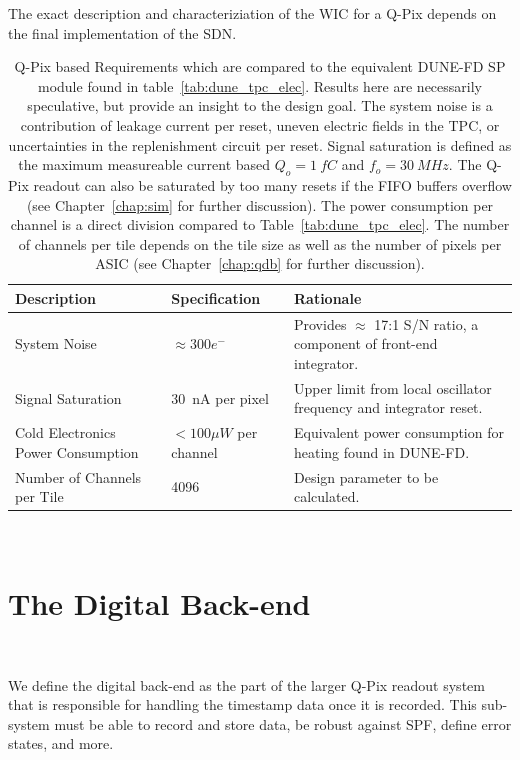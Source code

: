 The exact description and characteriziation of the WIC for a Q-Pix depends on the final implementation of the SDN.

\begin{table}
\begin{center}
\begin{tabular}{|| p{40mm} | p{40mm} | p{70mm} ||}
 \hline
 Description & Specification & Rationale \\ [0.5ex]
 \hline\hline
  System Noise & $\approx 300 e^{-}$ & Provides $\approx$ 17:1 S/N ratio, a component of front-end integrator. \\
 \hline
  Signal Saturation & 30~\unit{nA} per pixel & Upper limit from local oscillator frequency and integrator reset. \\
 \hline
  Cold Electronics Power Consumption &  $< 100 \unit{\mu W}$ per channel & Equivalent power consumption for heating found in DUNE-FD. \\
 \hline
  Number of Channels per Tile & 4096 &  Design parameter to be calculated. \\
 \hline
\end{tabular}
\caption{Q-Pix based Requirements which are compared to the equivalent DUNE-FD SP module found in table~\ref{tab:dune_tpc_elec}.
Results here are necessarily speculative, but provide an insight to the design goal.
The system noise is a contribution of leakage current per reset, uneven electric fields in the TPC, or uncertainties in the replenishment circuit per reset.
Signal saturation is defined as the maximum measureable current based $Q_{o} = 1~\unit{fC}$ and $f_{o} = 30~\unit{MHz}$.
The Q-Pix readout can also be saturated by too many resets if the FIFO buffers overflow (see Chapter~\ref{chap:sim} for further discussion).
The power consumption per channel is a direct division compared to Table~\ref{tab:dune_tpc_elec}.
The number of channels per tile depends on the tile size as well as the number of pixels per ASIC (see Chapter~\ref{chap:qdb} for further discussion).
}
\end{center}
\end{table}~\label{tab:qpix_tpc_elec}

\section{The Digital Back-end}~\label{sec:digital_back-end}

We define the digital back-end as the part of the larger Q-Pix readout system that is responsible for handling the timestamp data once it is recorded.
This sub-system must be able to record and store data, be robust against SPF, define error states, and more.

